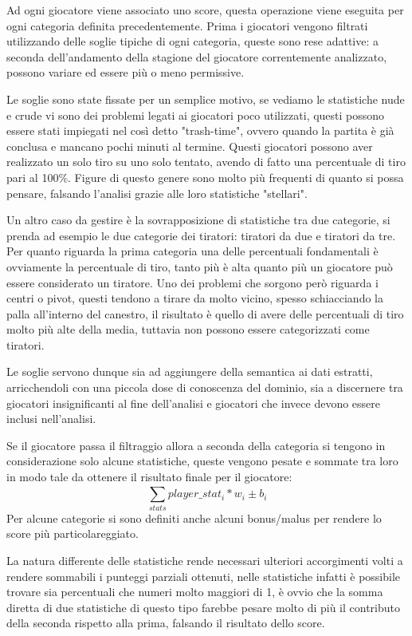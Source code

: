 \documentclass[10.5pt,a4paper,twocolumn]{article}
\begin{document}
Ad ogni giocatore viene associato uno score, questa operazione viene eseguita per ogni categoria definita precedentemente. Prima i giocatori vengono filtrati utilizzando delle soglie tipiche di ogni categoria, queste sono rese adattive: a seconda dell'andamento della stagione del giocatore correntemente analizzato, possono variare ed essere più o meno permissive. 

Le soglie sono state fissate per un semplice motivo, se vediamo le statistiche nude e crude vi sono dei problemi legati ai giocatori poco utilizzati, questi possono essere stati impiegati nel così detto "trash-time", ovvero quando la partita è già conclusa e mancano pochi minuti al termine. Questi giocatori possono aver realizzato un solo tiro su uno solo tentato, avendo di fatto una percentuale di tiro pari al 100\%. Figure di questo genere sono molto più frequenti di quanto si possa pensare, falsando l'analisi grazie alle loro statistiche "stellari".

Un altro caso da gestire è la sovrapposizione di statistiche tra due categorie, si prenda ad esempio le due categorie dei tiratori: tiratori da due e tiratori da tre. Per quanto riguarda la prima categoria una delle percentuali fondamentali è ovviamente la percentuale di tiro, tanto più è alta quanto più un giocatore può essere considerato un tiratore. Uno dei problemi che sorgono però riguarda i centri o pivot, questi tendono a tirare da molto vicino, spesso schiacciando la palla all'interno del canestro, il risultato è quello di avere delle percentuali di tiro molto più alte della media, tuttavia non possono essere categorizzati come tiratori.

Le soglie servono dunque sia ad aggiungere della semantica ai dati estratti, arricchendoli con una piccola dose di conoscenza del dominio, sia a discernere tra giocatori insignificanti al fine dell'analisi e giocatori che invece devono essere inclusi nell'analisi.

Se il giocatore passa il filtraggio allora a seconda della categoria si tengono in considerazione solo alcune statistiche, queste vengono pesate e sommate tra loro in modo tale da ottenere il risultato finale per il giocatore: \[\sum_{stats}^{} player\_stat_{i} * w_{i} \pm b_{i}\] Per alcune categorie si sono definiti anche alcuni bonus/malus per rendere lo score più particolareggiato. 

La natura differente delle statistiche rende necessari ulteriori accorgimenti volti a rendere sommabili i punteggi parziali ottenuti, nelle statistiche infatti è possibile trovare sia percentuali che numeri molto maggiori di 1, è ovvio che la somma diretta di due statistiche di questo tipo farebbe pesare molto di più il contributo della seconda rispetto alla prima, falsando il risultato dello score.
\end{document}
